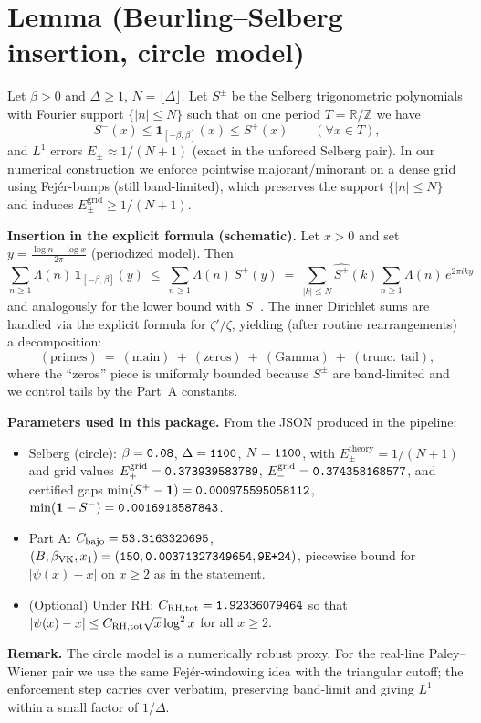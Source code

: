 ﻿\documentclass[11pt]{article}
\newcommand{\Chi}{\mathbf{1}}
\begin{document}
\section*{Lemma (Beurling--Selberg insertion, circle model)}
Let $\beta>0$ and $\Delta\ge1$, $N=\lfloor\Delta\rfloor$. Let $S^\pm$ be the Selberg trigonometric polynomials with
Fourier support $\{|n|\le N\}$ such that on one period $T=\mathbb{R}/\mathbb{Z}$ we have
\[
  S^-(x) \le \Chi_{[-\beta,\beta]}(x) \le S^+(x)\qquad(\forall x\in T),
\]
and $L^1$ errors $E_\pm \approx 1/(N+1)$ (exact in the unforced Selberg pair). In our numerical construction we enforce
pointwise majorant/minorant on a dense grid using Fejér-bumps (still band-limited), which preserves the support
$\{|n|\le N\}$ and induces $E_\pm^{\text{grid}}\ge 1/(N+1)$.

\medskip
\noindent\textbf{Insertion in the explicit formula (schematic).}
Let $x>0$ and set $y=\frac{\log n - \log x}{2\pi}$ (periodized model).
Then
\[
  \sum_{n\ge1} \Lambda(n)\, \Chi_{[-\beta,\beta]}(y)
  \ \le\ \sum_{n\ge1} \Lambda(n)\, S^+(y)
  \ =\ \sum_{|k|\le N} \widehat{S^+}(k) \sum_{n\ge1} \Lambda(n)\, e^{2\pi i k y}
\]
and analogously for the lower bound with $S^-$. The inner Dirichlet sums are handled via the explicit formula
for $\zeta'/\zeta$, yielding (after routine rearrangements) a decomposition:
\[
  (\text{primes})\ =\ (\text{main})\ +\ (\text{zeros})\ +\ (\text{Gamma})\ +\ (\text{trunc. tail}),
\]
where the ``zeros'' piece is uniformly bounded because $S^\pm$ are band-limited and we control tails by the Part~A constants.

\medskip
\noindent\textbf{Parameters used in this package.}
From the JSON produced in the pipeline:
\begin{itemize}
  \item Selberg (circle): $\beta = \verb|0.08|$, $\Delta=\verb|1100|$, $N=\verb|1100|$,
        with $E_\pm^{\text{theory}} = 1/(N+1)$ and grid values
        $E_+^{\text{grid}}=\verb|0.373939583789|$, $E_-^{\text{grid}}=\verb|0.374358168577|$,
        and certified gaps $\min(S^+-\Chi)=\verb|0.000975595058112|$, $\min(\Chi-S^-)=\verb|0.0016918587843|$.
  \item Part A: $C_{\text{bajo}}=\verb|53.3163320695|$, $(B,\beta_{\rm VK},x_1)=(\verb|150|,\verb|0.00371327349654|,\verb|9E+24|)$,
        piecewise bound for $|\psi(x)-x|$ on $x\ge2$ as in the statement.
  \item (Optional) Under RH: $C_{\rm RH,tot}=\verb|1.92336079464|$ so that
        $|\psi(x)-x|\le C_{\rm RH,tot}\sqrt{x}\log^2 x$ for all $x\ge2$.
\end{itemize}

\medskip
\noindent\textbf{Remark.} The circle model is a numerically robust proxy. For the real-line Paley--Wiener pair
we use the same Fejér-windowing idea with the triangular cutoff; the enforcement step carries over verbatim, preserving
band-limit and giving $L^1$ within a small factor of $1/\Delta$.
\end{document}
